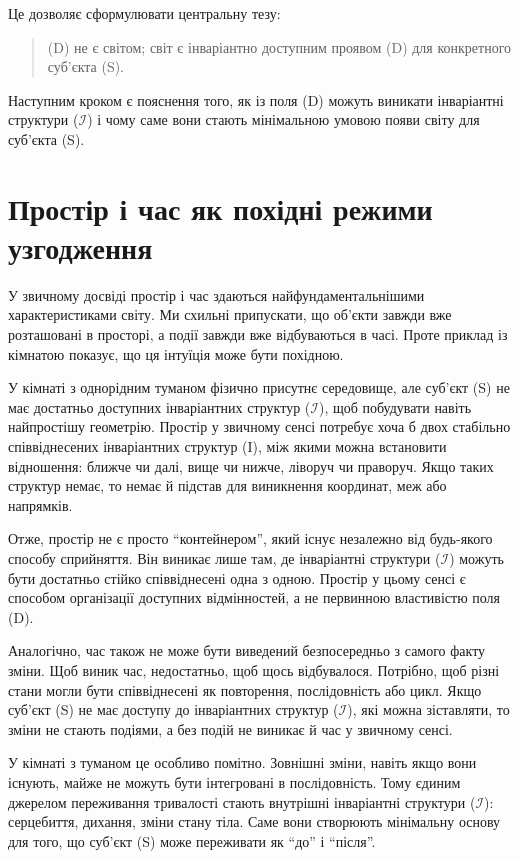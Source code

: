 \documentclass[aps,prd,onecolumn,nofootinbib,superscriptaddress]{revtex4-2}
\begin{document}
Це дозволяє сформулювати центральну тезу:
\begin{quote}
(D) не є світом; світ є інваріантно доступним проявом (D) для конкретного суб’єкта (S).
\end{quote}

Наступним кроком є пояснення того, як із поля (D) можуть виникати інваріантні структури ($\mathcal{I}$) і чому саме вони стають мінімальною умовою появи світу для суб’єкта (S).

\section{Простір і час як похідні режими узгодження}
У звичному досвіді простір і час здаються найфундаментальнішими характеристиками світу. Ми схильні припускати, що об’єкти завжди вже розташовані в просторі, а події завжди вже відбуваються в часі. Проте приклад із кімнатою показує, що ця інтуїція може бути похідною.

У кімнаті з однорідним туманом фізично присутнє середовище, але суб’єкт (S) не має достатньо доступних інваріантних структур ($\mathcal{I}$), щоб побудувати навіть найпростішу геометрію. Простір у звичному сенсі потребує хоча б двох стабільно співвіднесених інваріантних структур (I), між якими можна встановити відношення: ближче чи далі, вище чи нижче, ліворуч чи праворуч. Якщо таких структур немає, то немає й підстав для виникнення координат, меж або напрямків.

Отже, простір не є просто “контейнером”, який існує незалежно від будь-якого способу сприйняття. Він виникає лише там, де інваріантні структури ($\mathcal{I}$) можуть бути достатньо стійко співвіднесені одна з одною. Простір у цьому сенсі є способом організації доступних відмінностей, а не первинною властивістю поля (D).

Аналогічно, час також не може бути виведений безпосередньо з самого факту зміни. Щоб виник час, недостатньо, щоб щось відбувалося. Потрібно, щоб різні стани могли бути співвіднесені як повторення, послідовність або цикл. Якщо суб’єкт (S) не має доступу до інваріантних структур ($\mathcal{I}$), які можна зіставляти, то зміни не стають подіями, а без подій не виникає й час у звичному сенсі.

У кімнаті з туманом це особливо помітно. Зовнішні зміни, навіть якщо вони існують, майже не можуть бути інтегровані в послідовність. Тому єдиним джерелом переживання тривалості стають внутрішні інваріантні структури ($\mathcal{I}$): серцебиття, дихання, зміни стану тіла. Саме вони створюють мінімальну основу для того, що суб’єкт (S) може переживати як “до” і “після”.
\end{document}
